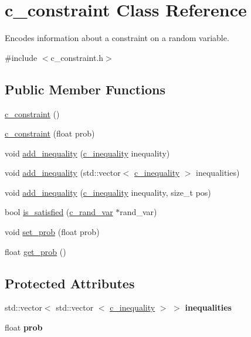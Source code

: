 \hypertarget{classc__constraint}{\section{c\-\_\-constraint \-Class \-Reference}
\label{classc__constraint}
}


\-Encodes information about a constraint on a random variable.  




{\ttfamily \#include $<$c\-\_\-constraint.\-h$>$}

\subsection*{\-Public \-Member \-Functions}
\begin{DoxyCompactItemize}
\item 
\hyperlink{classc__constraint_a8c1bb0a6e6788679dff5ff39df46a4af}{c\-\_\-constraint} ()
\item 
\hyperlink{classc__constraint_a86acee25e952aa3a612b904322bc9832}{c\-\_\-constraint} (float prob)
\item 
void \hyperlink{classc__constraint_a749f55d6860135890b3082d271945db4}{add\-\_\-inequality} (\hyperlink{classc__inequality}{c\-\_\-inequality} inequality)
\item 
void \hyperlink{classc__constraint_a678d694a90960306a4dba7ec0d350075}{add\-\_\-inequality} (std\-::vector$<$ \hyperlink{classc__inequality}{c\-\_\-inequality} $>$ inequalities)
\item 
void \hyperlink{classc__constraint_a20d77c2254a72ac2b52f728d0e78b483}{add\-\_\-inequality} (\hyperlink{classc__inequality}{c\-\_\-inequality} inequality, size\-\_\-t pos)
\item 
bool \hyperlink{classc__constraint_ac7c5c4d5fe85658606365702d12862c2}{is\-\_\-satisfied} (\hyperlink{classc__rand__var}{c\-\_\-rand\-\_\-var} $\ast$rand\-\_\-var)
\item 
void \hyperlink{classc__constraint_abf0c9672d7a270429444fa2103a4845e}{set\-\_\-prob} (float prob)
\item 
float \hyperlink{classc__constraint_af340872986035c2703a7ea67c972b538}{get\-\_\-prob} ()
\end{DoxyCompactItemize}
\subsection*{\-Protected \-Attributes}
\begin{DoxyCompactItemize}
\item 
\hypertarget{classc__constraint_a13783310adc5afd6c435539c87360063}{std\-::vector$<$ std\-::vector\*
$<$ \hyperlink{classc__inequality}{c\-\_\-inequality} $>$ $>$ {\bfseries inequalities}}\label{classc__constraint_a13783310adc5afd6c435539c87360063}

\item 
\hypertarget{classc__constraint_a6b698ea73bcc57dbf41558133dc7d43f}{float {\bfseries prob}}\label{classc__constraint_a6b698ea73bcc57dbf41558133dc7d43f}

\end{DoxyCompactItemize}


